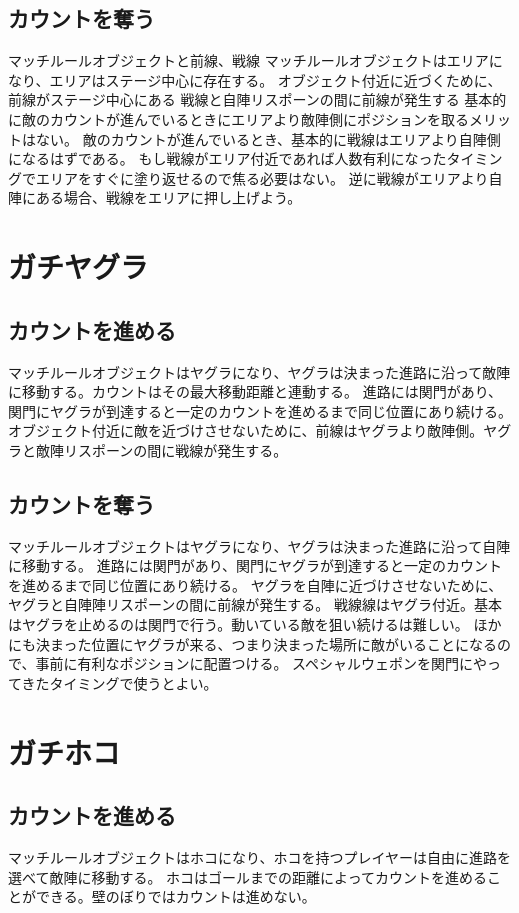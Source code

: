 \documentclass[a4paper,11pt]{jsbook}
\begin{document}
\subsection{カウントを奪う}
マッチルールオブジェクトと前線、戦線
マッチルールオブジェクトはエリアになり、エリアはステージ中心に存在する。
オブジェクト付近に近づくために、前線がステージ中心にある
戦線と自陣リスポーンの間に前線が発生する
基本的に敵のカウントが進んでいるときにエリアより敵陣側にポジションを取るメリットはない。
敵のカウントが進んでいるとき、基本的に戦線はエリアより自陣側になるはずである。
もし戦線がエリア付近であれば人数有利になったタイミングでエリアをすぐに塗り返せるので焦る必要はない。
逆に戦線がエリアより自陣にある場合、戦線をエリアに押し上げよう。

\section{ガチヤグラ}
\subsection{カウントを進める}
マッチルールオブジェクトはヤグラになり、ヤグラは決まった進路に沿って敵陣に移動する。カウントはその最大移動距離と連動する。
進路には関門があり、関門にヤグラが到達すると一定のカウントを進めるまで同じ位置にあり続ける。
オブジェクト付近に敵を近づけさせないために、前線はヤグラより敵陣側。ヤグラと敵陣リスポーンの間に戦線が発生する。

\subsection{カウントを奪う}
マッチルールオブジェクトはヤグラになり、ヤグラは決まった進路に沿って自陣に移動する。
進路には関門があり、関門にヤグラが到達すると一定のカウントを進めるまで同じ位置にあり続ける。
ヤグラを自陣に近づけさせないために、ヤグラと自陣陣リスポーンの間に前線が発生する。
戦線線はヤグラ付近。基本はヤグラを止めるのは関門で行う。動いている敵を狙い続けるは難しい。
ほかにも決まった位置にヤグラが来る、つまり決まった場所に敵がいることになるので、事前に有利なポジションに配置つける。
スペシャルウェポンを関門にやってきたタイミングで使うとよい。







\section{ガチホコ}
\subsection{カウントを進める}
マッチルールオブジェクトはホコになり、ホコを持つプレイヤーは自由に進路を選べて敵陣に移動する。
ホコはゴールまでの距離によってカウントを進めることができる。壁のぼりではカウントは進めない。
\end{document}
